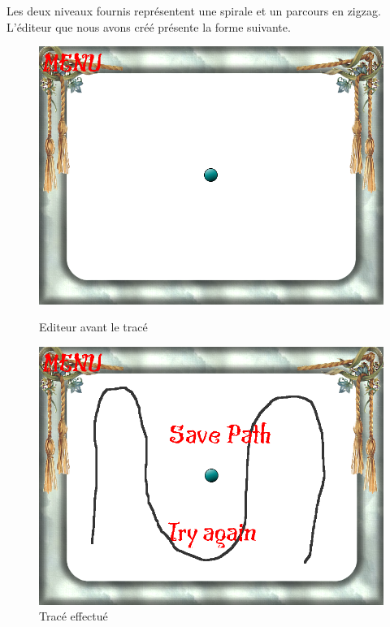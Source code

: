 Les deux niveaux fournis représentent une spirale et un parcours en zigzag. L'éditeur que nous avons créé présente la forme suivante.
\begin{figure}[H]
   \begin{minipage}[c]{.46\linewidth}
      \includegraphics[scale=0.3]{img/editor.png}
			\caption {Editeur avant le tracé} 
   \end{minipage} \hfil
   \begin{minipage}[c]{.46\linewidth}
      \includegraphics[scale=0.3]{img/editorpath.png}
			\caption {Tracé effectué} 
   \end{minipage}
\end{figure}
